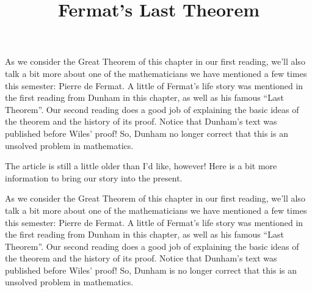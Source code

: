 \documentclass[nooutcomes]{ximera}
\title{Fermat's Last Theorem}
\begin{document}
\begin{abstract}
    
\end{abstract}
\maketitle

As we consider the Great Theorem of this chapter in our first reading,
we'll also talk a bit more about one of the mathematicians we have
mentioned a few times this semester: Pierre de Fermat.  A little of
Fermat's life story was mentioned in the first reading from Dunham in
this chapter, as well as his famous ``Last Theorem''.  Our second
reading does a good job of explaining the basic ideas of the theorem
and the history of its proof.  Notice that Dunham's text was published
before Wiles' proof!  So, Dunham no longer correct that this is an
unsolved problem in mathematics.

The article is still a little older than I'd like, however!  Here is a
bit more information to bring our story into the present.


As we consider the Great Theorem of this chapter in our first reading, we'll also talk a bit more about one of the mathematicians we have mentioned a few times this semester: Pierre de Fermat.  A little of Fermat's life story was mentioned in the first reading from Dunham in this chapter, as well as his famous ``Last Theorem''.  Our second reading does a good job of explaining the basic ideas of the theorem and the history of its proof.  Notice that Dunham's text was published before Wiles' proof!  So, Dunham is no longer correct that this is an unsolved problem in mathematics.
\end{document}
